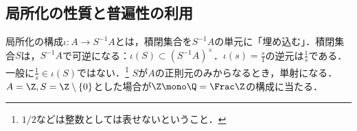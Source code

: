 \documentclass[uplatex,dvipdfmx]{jsreport}
\begin{document}
\subsection{局所化の性質と普遍性の利用}

\begin{tcolorbox}[colframe=ForestGreen, colback=ForestGreen!10!white,breakable,colbacktitle=ForestGreen!40!white,coltitle=black,fonttitle=\bfseries\sffamily,
title=]
    局所化の構成$\iota:A\to S^{-1}A$とは，積閉集合を$S^{-1}A$の単元に「埋め込む」．積閉集合$S$は，$S^{-1}A$で可逆になる：$\iota(S)\subset(S^{-1}A)^\times$．$\iota(s)=\frac{s}{1}$の逆元は$\frac{1}{s}$である．一般に$\frac{1}{s}\in\iota(S)$ではない．\footnote{$1/2$などは整数としては表せないということ．}
    $S$が$A$の正則元のみからなるとき，単射になる．$A=\Z,S=\Z\setminus\{0\}$とした場合が$\Z\mono\Q=\Frac\Z$の構成に当たる．
\end{tcolorbox}
\end{document}
